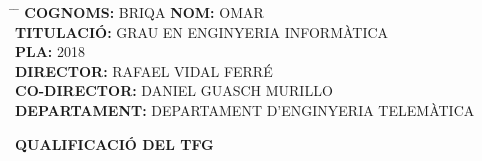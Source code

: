 \begin{titlepage}
    \begin{center}

        \begin{tcolorbox}
            \begin{minipage}{\textwidth}
                \begin{flushleft}
                    \begin{tabbing}
                        \hspace{2in} \= \hspace{1.5in} \= \kill
                        \textbf{COGNOMS:} BRIQA \> \textbf{NOM:} OMAR \\ [0.2cm]
                        \textbf{TITULACIÓ:} GRAU EN ENGINYERIA INFORMÀTICA \\ [0.2cm]
                        \textbf{PLA:} 2018 \\ [0.2cm]
                        \textbf{DIRECTOR:} RAFAEL VIDAL FERRÉ \\ [0.2cm]
                        \textbf{CO-DIRECTOR:} DANIEL GUASCH MURILLO \\ [0.2cm]
                        \textbf{DEPARTAMENT:} DEPARTAMENT D’ENGINYERIA TELEMÀTICA
                    \end{tabbing}
                \end{flushleft}
            \end{minipage}
        \end{tcolorbox}

        \vspace{1.5cm}


        \begin{tcolorbox}
            \centering
                \textbf{QUALIFICACIÓ DEL TFG}
                \vspace{2cm}
        \end{tcolorbox}

        \vspace{1.5cm}


\end{center}
\end{titlepage}
